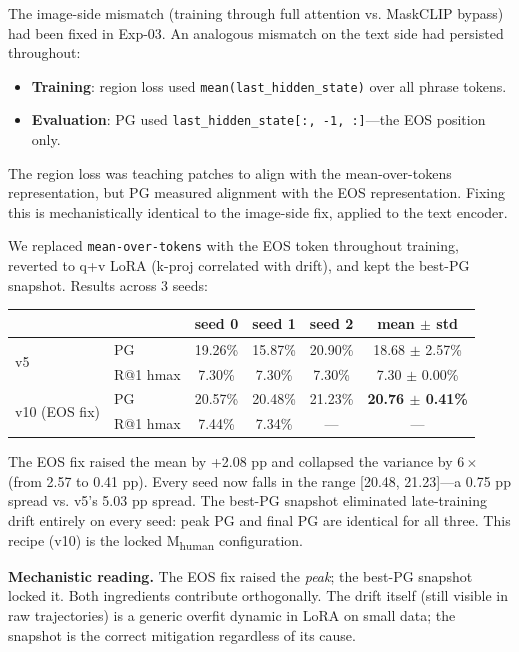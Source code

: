 \documentclass{article}
\begin{document}
The image-side mismatch (training through full attention vs. MaskCLIP bypass)
had been fixed in Exp-03. An analogous mismatch on the text side had persisted
throughout:
\begin{itemize}
\item \textbf{Training}: region loss used \texttt{mean(last\_hidden\_state)}
  over all phrase tokens.
\item \textbf{Evaluation}: PG used \texttt{last\_hidden\_state[:, -1, :]}---the
  EOS position only.
\end{itemize}
The region loss was teaching patches to align with the mean-over-tokens
representation, but PG measured alignment with the EOS representation. Fixing
this is mechanistically identical to the image-side fix, applied to the text
encoder.

We replaced \texttt{mean-over-tokens} with the EOS token throughout training,
reverted to q+v LoRA (k-proj correlated with drift), and kept the best-PG
snapshot. Results across 3 seeds:

\begin{center}
\begin{tabular}{llcccc}
\toprule
 & & seed 0 & seed 1 & seed 2 & mean $\pm$ std \\
\midrule
\multirow{2}{*}{v5} & PG       & 19.26\% & 15.87\% & 20.90\% & 18.68 $\pm$ 2.57\% \\
                    & R@1 hmax & 7.30\%  & 7.30\%  & 7.30\%  & 7.30 $\pm$ 0.00\% \\
\midrule
\multirow{2}{*}{v10 (EOS fix)} & PG       & 20.57\% & 20.48\% & 21.23\% & \textbf{20.76 $\pm$ 0.41\%} \\
                               & R@1 hmax & 7.44\%  & 7.34\%  & ---     & --- \\
\bottomrule
\end{tabular}
\end{center}

The EOS fix raised the mean by +2.08 pp and collapsed the variance by $6\times$
(from 2.57 to 0.41 pp). Every seed now falls in the range [20.48, 21.23]---a
0.75 pp spread vs. v5's 5.03 pp spread. The best-PG snapshot eliminated
late-training drift entirely on every seed: peak PG and final PG are identical
for all three. This recipe (v10) is the locked M\textsubscript{human}
configuration.

\textbf{Mechanistic reading.} The EOS fix raised the \emph{peak}; the best-PG
snapshot locked it. Both ingredients contribute orthogonally. The drift itself
(still visible in raw trajectories) is a generic overfit dynamic in LoRA on
small data; the snapshot is the correct mitigation regardless of its cause.
\end{document}
